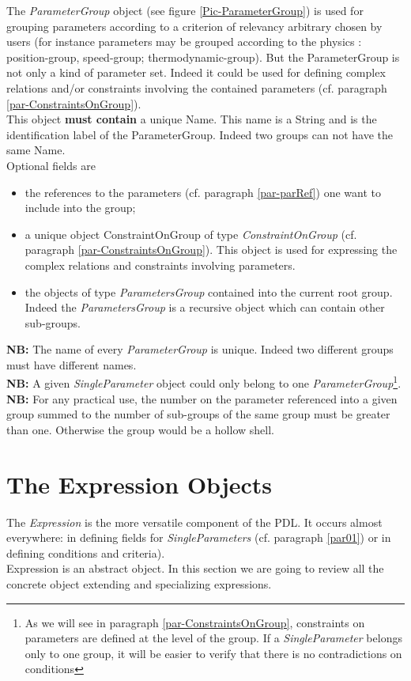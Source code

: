 \documentclass[a4paper,11pt] {article}
\begin{document}
The {\it ParameterGroup} object (see figure \ref{Pic-ParameterGroup}) is used for grouping
parameters according to a criterion of relevancy arbitrary chosen by users (for instance parameters
may be grouped according to the physics : position-group, speed-group; thermodynamic-group).
But  the ParameterGroup is not only a kind of parameter set. Indeed it could be used for defining
complex relations and/or constraints involving the contained parameters (cf. paragraph
\ref{par-ConstraintsOnGroup}).\\
This object {\bf must contain} a unique Name. This name is a String and is the identification label
of the ParameterGroup. Indeed two groups can not have the same Name.\\
Optional fields are
\begin{itemize}
\item the references to the parameters (cf. paragraph \ref{par-parRef}) one want to include into the
group;
\item a unique object ConstraintOnGroup of type {\it ConstraintOnGroup} (cf. paragraph 
\ref{par-ConstraintsOnGroup}). This object is used for expressing the complex relations and
constraints involving parameters.
\item the objects of type {\it ParametersGroup} contained into the current root group. Indeed the
{\it ParametersGroup} is a recursive object which can contain other sub-groups.
\end{itemize}

{\bf NB:} The name of every {\it ParameterGroup} is unique. Indeed two different groups must have
different names.\\

{\bf NB:} A given {\it SingleParameter} object could only belong to one {\it
ParameterGroup}\footnote{As we will see in paragraph \ref{par-ConstraintsOnGroup}, constraints on
parameters are defined at the level of the group. If a {\it SingleParameter} belongs only to one
group, it will be easier to verify that there is no contradictions on conditions}.
{\bf NB:}  For any practical use, the number on the parameter referenced into a given group summed
to the number of sub-groups of the same group must be greater than one. Otherwise the group would be
a hollow shell.


\section{The Expression Objects}\label{par02}
The {\it Expression} is the more versatile component of the PDL. It occurs almost everywhere: in
defining fields for {\it SingleParameters} (cf. paragraph \ref{par01}) or in defining conditions and
criteria).\\
Expression is an abstract object. In this section we are going to review all the concrete object
extending and specializing expressions.\\
\end{document}
